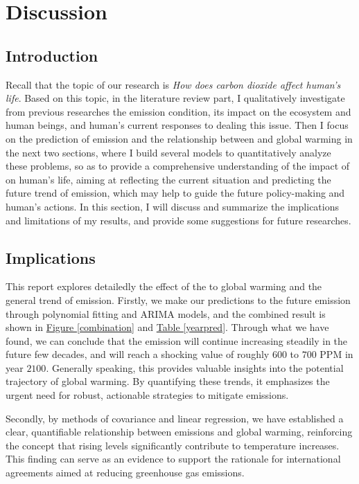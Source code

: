 \documentclass[12pt,a4paper]{article}
\begin{document}
    \section{Discussion}
    \subsection{Introduction}
    Recall that the topic of our research is \textit{How does carbon dioxide affect human's life}. Based on this topic, in the literature review part, I qualitatively investigate from previous researches the  emission condition, its impact on the ecosystem and human beings, and human's current responses to dealing this issue. Then I focus on the prediction of  emission and the relationship between  and global warming in the next two sections, where I build several models to quantitatively analyze these problems, so as to provide a comprehensive understanding of the impact of  on human's life, aiming at reflecting the current situation and predicting the future trend of  emission, which may help to guide the future policy-making and human's actions. In this section, I will discuss and summarize the implications and limitations of my results, and provide some suggestions for future researches.
    
    \subsection{Implications}
    This report explores detailedly the effect of the  to global warming and the general trend of  emission. Firstly, we make our predictions to the future  emission through polynomial fitting and ARIMA models, and the combined result is shown in \hyperref[combination]{Figure \ref*{combination}} and \hyperref[yearpred]{Table \ref*{yearpred}}. Through what we have found, we can conclude that the  emission will continue increasing steadily in the future few decades, and will reach a shocking value of roughly $600$ to $700$ PPM in year $2100$. Generally speaking, this provides valuable insights into the potential trajectory of global warming. By quantifying these trends, it emphasizes the urgent need for robust, actionable strategies to mitigate  emissions. 

    Secondly, by methods of covariance and linear regression, we have established a clear, quantifiable relationship between  emissions and global warming, reinforcing the concept that rising  levels significantly contribute to temperature increases. This finding can serve as an evidence to support the rationale for international agreements aimed at reducing greenhouse gas emissions.
\end{document}
